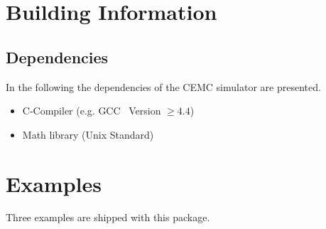 


\section{Building Information} %

\subsection{Dependencies} \label{boltzmann:dependencies}

In the following the dependencies of the CEMC simulator are presented.

\begin{itemize}
  \item C-Compiler (e.g. GCC~\cite{gcc} Version $\geq4.4$)
  \item Math library (Unix Standard)
\end{itemize}



\section{Examples} \label{boltzmann:examples}
Three examples are shipped with this package.

